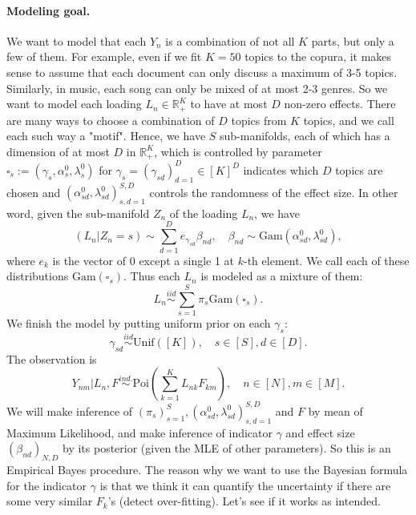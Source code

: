 \documentclass[11pt,twoside]{article}
\newcommand{\Rbb}{\ensuremath{\mathbb{R}}}
\theoremstyle{plain}
\numberwithin{theorem}{section}
\numberwithin{proposition}{section}
\numberwithin{lemma}{section}
\numberwithin{definition}{section}
\numberwithin{condition}{section}
\numberwithin{problem}{section}
\numberwithin{corollary}{section}
\numberwithin{assumption}{section}
\numberwithin{example}{section}
\numberwithin{conjecture}{section}
\theoremstyle{definition}
\numberwithin{remark}{section}
\begin{document}
\paragraph{Modeling goal.} We want to model that each $Y_n$ is a combination of not all $K$ parts, but only a few of them. For example, even if we fit $K = 50$ topics to the copura, it makes sense to assume that each document can only discuss a maximum of 3-5 topics. Similarly, in music, each song can only be mixed of at most 2-3 genres. So we want to model each loading $L_n \in \Rbb_{+}^{K}$ to have at most $D$ non-zero effects. There are many ways to choose a combination of $D$ topics from $K$ topics, and we call each such way a "motif". Hence, we have $S$ sub-manifolds, each of which has a dimension of at most $D$ in $\Rbb_+^K$, which is controlled by parameter $\square_s := (\gamma_s, \alpha^{0}_s, \lambda^{0}_s)$ for $\gamma_s = (\gamma_{sd})_{d = 1}^{D} \in [K]^{D}$ indicates which $D$ topics are chosen and $(\alpha^{0}_{sd}, \lambda^{0}_{sd})_{s, d = 1}^{S, D}$ controls the randomness of the effect size. In other word, given the sub-manifold $Z_n$ of the loading $L_n$, we have
\begin{equation}
    (L_n | Z_n = s) \sim \sum_{d = 1}^{D} e_{\gamma_{sd}} \beta_{nd}, \quad \beta_{nd} \sim \mathrm{Gam}(\alpha^{0}_{sd}, \lambda^{0}_{sd}),
\end{equation}
where $e_{k}$ is the vector of 0 except a single 1 at $k$-th element. We call each of these distributions $\mathrm{Gam}(\square_s)$. Thus each $L_n$ is modeled as a mixture of them:
\begin{equation}
    L_n \overset{iid}{\sim} \sum_{s=1}^{S} \pi_s \mathrm{Gam}(\square_s).
\end{equation}
We finish the model by putting uniform prior on each $\gamma_s$:
\begin{equation}
    \gamma_{sd} \overset{iid}{\sim} \mathrm{Unif}([K]), \quad s\in [S], d \in [D].
\end{equation}
The observation is 
\begin{equation}
    Y_{nm} | L_n, F \overset{ind.}{\sim} \mathrm{Poi}(\sum_{k=1}^{K} L_{nk} F_{km}), \quad n\in [N], m\in [M].
\end{equation}
We will make inference of $(\pi_{s})_{s=1}^{S}, (\alpha^{0}_{sd}, \lambda^{0}_{sd})_{s, d =1}^{S, D}$ and $F$ by mean of Maximum Likelihood, and make inference of indicator $\gamma$ and effect size $(\beta_{nd})_{N, D}$ by its posterior (given the MLE of other parameters). So this is an Empirical Bayes procedure. The reason why we want to use the Bayesian formula for the indicator $\gamma$ is that we think it can quantify the uncertainty if there are some very similar $F_k$'s (detect over-fitting). Let's see if it works as intended.
\end{document}
